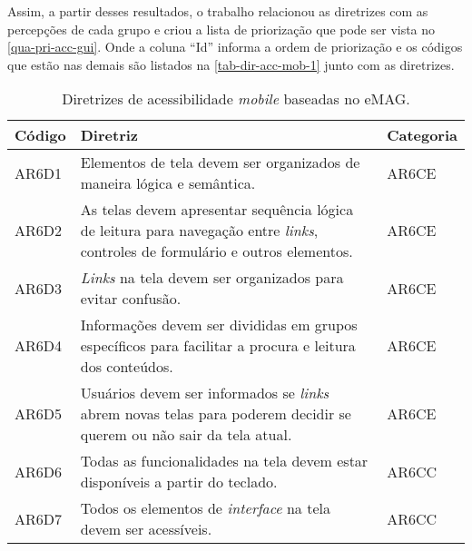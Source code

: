 Assim, a partir desses resultados, o trabalho relacionou as diretrizes com as percepções de cada grupo
e criou a lista de priorização que pode ser vista no \autoref{qua-pri-acc-gui}.
Onde a coluna ``Id'' informa a ordem de priorização e os códigos que estão nas demais são listados na \autoref{tab-dir-acc-mob-1} junto com as diretrizes.

\begin{table}[htb]
  \begin{center}
    \ABNTEXfontereduzida
    \caption{Diretrizes de acessibilidade \emph{mobile} baseadas no eMAG.}
    \label{tab-dir-acc-mob-1}
    \begin{tabular}{p{1.2cm}|p{12.0cm}|p{1.5cm}}
      \textbf{Código} & \textbf{Diretriz}                                                                                                                            & \textbf{Categoria} \\
      \hline
      AR6D1           & Elementos de tela devem ser organizados de maneira lógica e semântica.                                                                       & AR6CE              \\
      \hline
      AR6D2           & As telas devem apresentar sequência lógica de leitura para navegação entre \emph{links}, controles de formulário e outros elementos.         & AR6CE              \\
      \hline
      AR6D3           & \emph{Links} na tela devem ser organizados para evitar confusão.                                                                             & AR6CE              \\
      \hline
      AR6D4           & Informações devem ser divididas em grupos específicos para facilitar a procura e leitura dos conteúdos.                                      & AR6CE              \\
      \hline
      AR6D5           & Usuários devem ser informados se \emph{links} abrem novas telas para poderem decidir se querem ou não sair da tela atual.                    & AR6CE              \\
      \hline
      AR6D6           & Todas as funcionalidades na tela devem estar disponíveis a partir do teclado.                                                                & AR6CC              \\
      \hline
      AR6D7           & Todos os elementos de \emph{interface} na tela devem ser acessíveis.                                                                         & AR6CC              \\

\end{tabular}
\end{center}
\end{table}
